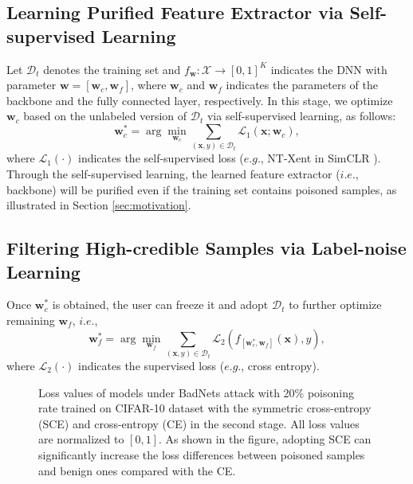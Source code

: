 \subsection{Learning Purified Feature Extractor via Self-supervised Learning}
\label{sec:purified}

Let $\mathcal{D}_t$ denotes the training set and $f_{\bm{w}}: \mathcal{X} \rightarrow [0,1]^K$ indicates the DNN with parameter $\bm{w}=[\bm{w}_c, \bm{w}_f]$, where $\bm{w}_c$ and $\bm{w}_f$ indicates the parameters of the backbone and the fully connected layer, respectively. In this stage, we optimize $\bm{w}_c$ based on the unlabeled version of $\mathcal{D}_t$ via self-supervised learning, as follows:
\begin{equation}\label{eq:w_c}
    \bm{w}_c^{*} = \arg \min_{\bm{w}_c} \sum_{(\bm{x},y) \in \mathcal{D}_t} \mathcal{L}_1(\bm{x};\bm{w}_c),
\end{equation}
where $\mathcal{L}_1(\cdot)$ indicates the self-supervised loss ($e.g.$, NT-Xent in SimCLR \citep{chen2020simple}). %
Through the self-supervised learning, the learned feature extractor ($i.e.$, backbone) will be purified even if the training set contains poisoned samples, as illustrated in Section \ref{sec:motivation}. 

\subsection{Filtering High-credible Samples via Label-noise Learning}
\label{sec:filtering}
Once $\bm{w}_c^{*}$ is obtained, the user can freeze it and adopt $\mathcal{D}_t$ to further optimize remaining $\bm{w}_f$, $i.e.$,  
\begin{equation}\label{eq:w_f}
    \bm{w}_f^{*} = \arg \min_{\bm{w}_f} \sum_{(\bm{x},y) \in \mathcal{D}_t} \mathcal{L}_2\left(f_{[\bm{w}_c^{*},\bm{w}_f]}(\bm{x}), y \right),
\end{equation}
where $\mathcal{L}_2(\cdot)$ indicates the supervised loss ($e.g.$, cross entropy).

\begin{figure*}[ht]
\centering
{}
\hspace{0.3em}
\vspace{-0.7em}
\caption{Loss values of models under BadNets attack with 20\% poisoning rate trained on CIFAR-10 dataset with the symmetric cross-entropy (SCE) and cross-entropy (CE) in the second stage. All loss values are normalized to $[0, 1]$. As shown in the figure, adopting SCE can significantly increase the loss differences between poisoned samples and benign ones compared with the CE. }
\label{fig:sce}
\end{figure*}

